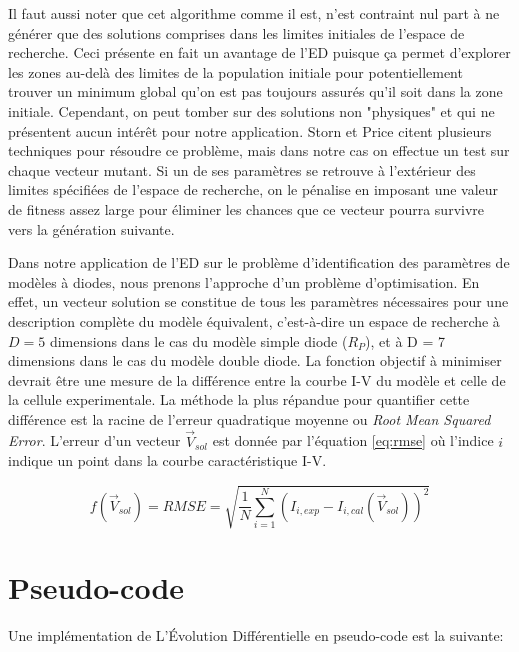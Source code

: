 Il faut aussi noter que cet algorithme comme il est, n'est contraint nul part à ne générer que des solutions comprises dans les limites initiales de l'espace de recherche. Ceci présente en fait un avantage de l'ED puisque ça permet d'explorer les zones au-delà des limites de la population initiale pour potentiellement trouver un minimum global qu'on est pas toujours assurés qu'il soit dans la zone initiale. Cependant, on peut tomber sur des solutions non "physiques" et qui ne présentent aucun intérêt pour notre application. Storn et Price citent plusieurs techniques pour résoudre ce problème, mais dans notre cas on effectue un test sur chaque vecteur mutant. Si un de ses paramètres se retrouve à l'extérieur des limites spécifiées de l'espace de recherche, on le pénalise en imposant une valeur de fitness assez large pour éliminer les chances que ce vecteur pourra survivre vers la génération suivante.

Dans notre application de l'ED sur le problème d'identification des paramètres de modèles à diodes, nous prenons l'approche d'un problème d'optimisation. En effet, un vecteur solution se constitue de tous les paramètres nécessaires pour une description complète du modèle équivalent, c'est-à-dire un espace de recherche à $D = 5$ dimensions dans le cas du modèle simple diode ($R_P$), et à D = 7 dimensions dans le cas du modèle double diode. La fonction objectif à minimiser devrait être une mesure de la différence entre la courbe I-V du modèle et celle de la cellule experimentale. La méthode la plus répandue pour quantifier cette différence est la racine de l'erreur quadratique moyenne ou \textit{Root Mean Squared Error}. L'erreur d'un vecteur $\vec{V}_{sol}$ est donnée par l'équation \ref{eq:rmse} où l'indice $i$ indique un point dans la courbe caractéristique I-V.

\begin{equation}
  \label{eq:rmse}
  f(\vec{V}_{sol}) = RMSE = \sqrt{\frac{1}{N} \sum_{i = 1}^{N} (I_{i,exp} - I_{i, cal}(\vec{V}_{sol}))^2 }
\end{equation}

\section{Pseudo-code}
Une implémentation de L'Évolution Différentielle en pseudo-code est la suivante:

